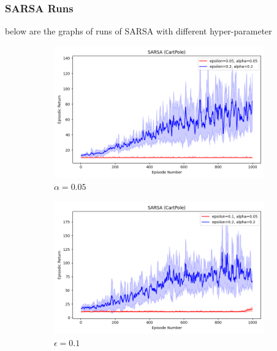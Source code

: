 \documentclass[11pt, a4]{article}
\begin{document}
			\subsubsection{SARSA Runs}
			below are the graphs of runs of SARSA with different hyper-parameter
			\noindent
			\begin{figure}[h]
				\centering
				\begin{subfigure}[h]{0.3\textwidth}
					\centering
					\includegraphics[width=\textwidth]{../cartpole-v1/plots/sarsa_0.05_0.05vs0.2_0.2.png}
					\caption{$\alpha = 0.05$}
				\end{subfigure}
				\hfill
				\begin{subfigure}[h]{0.3\textwidth}
					\centering
					\includegraphics[width=\textwidth]{../cartpole-v1/plots/sarsa_0.05_0.1vs0.2_0.2.png}
					\caption{$\epsilon = 0.1$}
				\end{subfigure}
				\hfill
				\begin{subfigure}[h]{0.3\textwidth}

\end{subfigure}
\end{figure}
\end{document}
